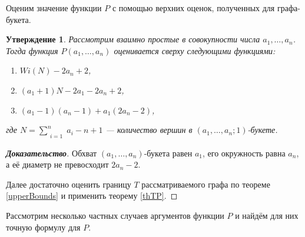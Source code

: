\documentclass[12pt]{article}
\newtheorem{proposition}[theorem]{Утверждение}
\begin{document}
Оценим значение функции $P$ с помощью верхних оценок, полученных для графа-букета.

\begin{proposition}
\label{upperBoundsP}
Рассмотрим взаимно простые в совокупности числа $a_1, \dots, a_n$. Тогда функция $P(a_1, \dots, a_n)$ оценивается сверху следующими функциями:
\begin{enumerate}
\item $Wi(N) - 2a_n + 2$,
\item $(a_1 + 1)N - 2a_1 - 2a_n + 2$,
\item $(a_1 - 1)(a_n - 1) + a_1(2a_n - 2)$,
\end{enumerate}
где $N = \sum\limits_{\substack{i=1}}^n a_i - n + 1$ --- количество вершин в $(a_1, \dots, a_n; 1)$-букете.
\end{proposition}
\begin{proof}[\textbf{Доказательство}]
Обхват $(a_1, \dots, a_n)$-букета равен $a_1$, его окружность равна $a_n$, а её диаметр не превосходит $2a_n - 2$.

Далее достаточно оценить границу $T$ рассматриваемого графа по теореме \ref{upperBounds} и применить теорему \ref{thTP}.
\end{proof}

Рассмотрим несколько частных случаев аргументов функции $P$ и найдём для них точную формулу для $P$.
\end{document}
